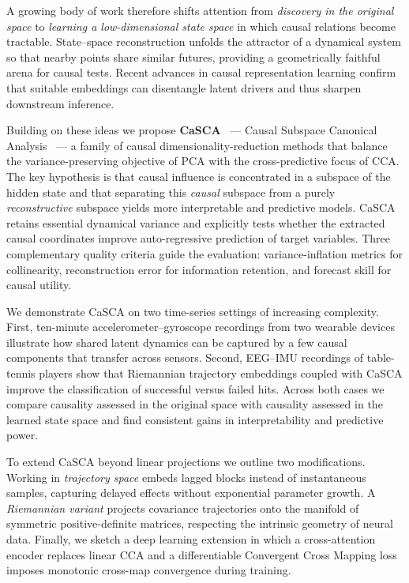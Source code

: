 \documentclass[14pt]{extarticle}
\begin{document}
	A growing body of work therefore shifts attention from \emph{discovery in the original space} to \emph{learning a low-dimensional state space} in which causal relations become tractable.  
	State–space reconstruction unfolds the attractor of a dynamical system so that nearby points share similar futures, providing a geometrically faithful arena for causal tests.  
	Recent advances in causal representation learning \citep{Scholkopf2021} confirm that suitable embeddings can disentangle latent drivers and thus sharpen downstream inference.  
	
	Building on these ideas we propose \textbf{CaSCA} ~--- Causal Subspace Canonical Analysis ~--- a family of causal dimensionality-reduction methods that balance the variance-preserving objective of PCA with the cross-predictive focus of CCA.  
	The key hypothesis is that causal influence is concentrated in a subspace of the hidden state and that separating this \emph{causal} subspace from a purely \emph{reconstructive} subspace yields more interpretable and predictive models.  
	CaSCA retains essential dynamical variance and explicitly tests whether the extracted causal coordinates improve auto-regressive prediction of target variables.  
	Three complementary quality criteria guide the evaluation: variance-inflation metrics for collinearity, reconstruction error for information retention, and forecast skill for causal utility.  
	
	We demonstrate CaSCA on two time-series settings of increasing complexity.  
	First, ten-minute accelerometer–gyroscope recordings from two wearable devices illustrate how shared latent dynamics can be captured by a few causal components that transfer across sensors.  
	Second, EEG–IMU recordings of table-tennis players show that Riemannian trajectory embeddings coupled with CaSCA improve the classification of successful versus failed hits.  
	Across both cases we compare causality assessed in the original space with causality assessed in the learned state space and find consistent gains in interpretability and predictive power.  
	
	To extend CaSCA beyond linear projections we outline two modifications.  
	Working in \emph{trajectory space} embeds lagged blocks instead of instantaneous samples, capturing delayed effects without exponential parameter growth.  
	A \emph{Riemannian variant} projects covariance trajectories onto the manifold of symmetric positive-definite matrices, respecting the intrinsic geometry of neural data.  
	Finally, we sketch a deep learning extension in which a cross-attention encoder replaces linear CCA and a differentiable Convergent Cross Mapping loss imposes monotonic cross-map convergence during training.  
	
\end{document}
